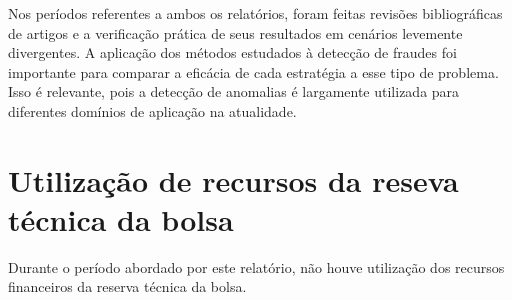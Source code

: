 \documentclass[11pt]{article}
\begin{document}
Nos períodos referentes a ambos os relatórios, foram feitas revisões bibliográficas de artigos e a verificação prática de seus resultados em cenários levemente divergentes. A aplicação dos métodos estudados à detecção de fraudes foi importante para comparar a eficácia de cada estratégia a esse tipo de problema. Isso é relevante, pois a detecção de anomalias é largamente utilizada para diferentes domínios de aplicação na atualidade.


\newpage

\section*{Utilização de recursos da reseva técnica da bolsa}

Durante o período abordado por este relatório, não houve utilização dos recursos financeiros da reserva técnica da bolsa.

\newpage

\printbibliography
\end{document}
